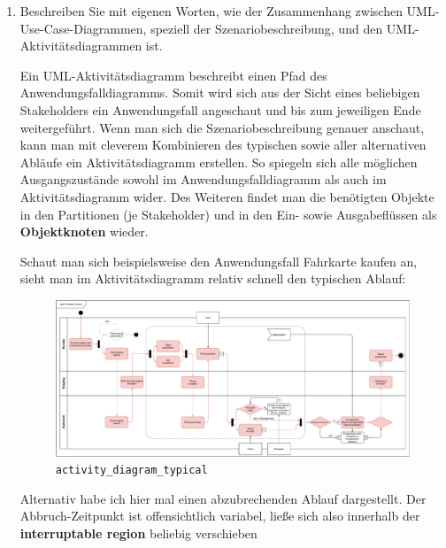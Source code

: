 \documentclass{article}
\newcommand{\gqq}[1]{\glqq{}#1\grqq{}}
\begin{document}
\begin{enumerate}[label=\alph*.]
        \newpage
        \item Beschreiben Sie mit eigenen Worten, wie der Zusammenhang zwischen UML-Use-Case-Diagrammen, speziell der Szenariobeschreibung, und den UML-Aktivitätsdiagrammen ist.

            \begin{displayquote}
                Ein UML-Aktivitätsdiagramm beschreibt einen Pfad des Anwendungsfalldiagramms.
                Somit wird sich aus der Sicht eines beliebigen Stakeholders ein Anwendungsfall angeschaut und bis zum jeweiligen Ende weitergeführt.
                Wenn man sich die Szenariobeschreibung genauer anschaut, kann man mit cleverem Kombinieren des typischen sowie aller alternativen Abläufe ein Aktivitätsdiagramm erstellen.
                So spiegeln sich alle möglichen Ausgangszustände sowohl im Anwendungsfalldiagramm als auch im Aktivitätsdiagramm wider.
                Des Weiteren findet man die benötigten Objekte in den Partitionen (je Stakeholder) und in den Ein- sowie Ausgabeflüssen als \textbf{Objektknoten} wieder.

                \vspace{1em}
                Schaut man sich beispielsweise den Anwendungsfall \gqq{Fahrkarte kaufen} an, sieht man im Aktivitätsdiagramm relativ schnell den typischen Ablauf:
                
                \begin{figure}[ht]
                    \includegraphics[width=\textwidth]{swt_wende_tim_h04_activity_diagram_typical.pdf}
                    \caption{\texttt{activity\_diagram\_typical}}
                \end{figure}

                Alternativ habe ich hier mal einen abzubrechenden Ablauf dargestellt.
                Der Abbruch-Zeitpunkt ist offensichtlich variabel, ließe sich also innerhalb der \textbf{interruptable region} beliebig verschieben


\end{displayquote}
\end{enumerate}
\end{document}
